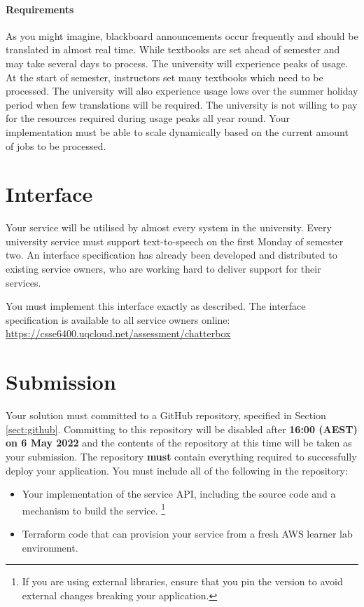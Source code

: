 \documentclass{csse4400}
\begin{document}
\paragraph{Requirements}
As you might imagine,
blackboard announcements occur frequently and should be translated in almost real time.
While textbooks are set ahead of semester and may take several days to process.
The university will experience peaks of usage.
At the start of semester,
instructors set many textbooks which need to be processed.
The university will also experience usage lows over the summer holiday period when few translations will be required.
The university is not willing to pay for the resources required during usage peaks all year round.
Your implementation must be able to scale dynamically based on the current amount of jobs to be processed.



\section{Interface}
Your service will be utilised by almost every system in the university.
Every university service must support text-to-speech on the first Monday of semester two.
An interface specification has already been developed and distributed to existing service owners,
who are working hard to deliver support for their services.

You must implement this interface exactly as described.
The interface specification is available to all service owners online:
\url{https://csse6400.uqcloud.net/assessment/chatterbox}

\section{Submission}
Your solution must committed to a GitHub repository, specified in Section \ref{sect:github}.
Committing to this repository will be disabled after \textbf{16:00 (AEST) on 6 May 2022} and the contents of the repository at this time will be taken as your submission.
The repository \textbf{must} contain everything required to successfully deploy your application.
You must include all of the following in the repository:
\begin{itemize}
  \item Your implementation of the service API, including the source code and a mechanism to build the service.%
  \footnote{If you are using external libraries, ensure that you pin the version to avoid external changes breaking your application.}
  \item Terraform code that can provision your service from a fresh AWS learner lab environment.
\end{itemize}
\end{document}
